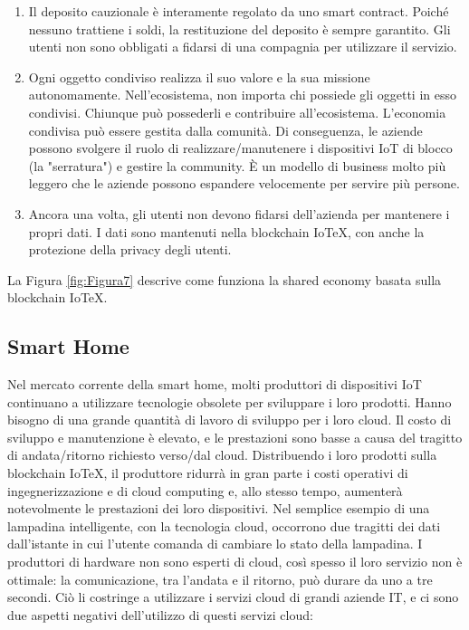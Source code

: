 \begin{enumerate}
    \item Il deposito cauzionale è interamente regolato da uno smart contract. Poiché nessuno trattiene i soldi, la restituzione del deposito è sempre garantito. Gli utenti non sono obbligati a fidarsi di una compagnia per utilizzare il servizio.

    \item Ogni oggetto condiviso realizza il suo valore e la sua missione autonomamente. Nell'ecosistema, non importa chi possiede gli oggetti in esso condivisi. Chiunque può possederli e contribuire all'ecosistema. L'economia condivisa può essere gestita dalla comunità. Di conseguenza, le aziende possono svolgere il ruolo di realizzare/manutenere i dispositivi IoT di blocco (la "serratura") e gestire la community. È un modello di business molto più leggero che le aziende possono espandere velocemente per servire più persone.

    \item Ancora una volta, gli utenti non devono fidarsi dell'azienda per mantenere i propri dati. I dati sono mantenuti nella blockchain IoTeX, con anche la protezione della privacy degli utenti.
\end{enumerate}

La Figura \ref{fig:Figura7} descrive come funziona la shared economy basata sulla blockchain IoTeX.

\subsection{Smart Home}

Nel mercato corrente della smart home, molti produttori di dispositivi IoT continuano a utilizzare tecnologie obsolete per sviluppare i loro prodotti. Hanno bisogno di una grande quantità di lavoro di sviluppo per i loro cloud. Il costo di sviluppo e manutenzione è elevato, e le prestazioni sono basse a causa del tragitto di andata/ritorno richiesto verso/dal cloud. Distribuendo i loro prodotti sulla blockchain IoTeX, il produttore ridurrà in gran parte i costi operativi di ingegnerizzazione e di cloud computing e, allo stesso tempo, aumenterà notevolmente le prestazioni dei loro dispositivi. Nel semplice esempio di una lampadina intelligente, con la tecnologia cloud, occorrono due tragitti dei dati dall'istante in cui l'utente comanda di cambiare lo stato della lampadina. I produttori di hardware non sono esperti di cloud, così spesso il loro servizio non è ottimale: la comunicazione, tra l'andata e il ritorno, può durare da uno a tre secondi. Ciò li costringe a utilizzare i servizi cloud di grandi aziende IT, e ci sono due aspetti negativi dell'utilizzo di questi servizi cloud:

